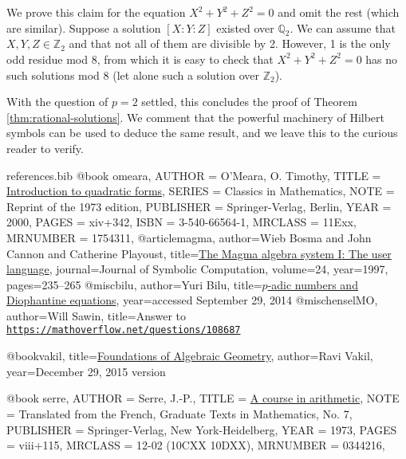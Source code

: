 \documentclass[10pt,a4paper]{amsart}
\numberwithin{equation}{section}
\numberwithin{figure}{section}
\numberwithin{table}{section}
\theoremstyle{definition}
\theoremstyle{plain}
\theoremstyle{remark}
\theoremstyle{plain}
\theoremstyle{definition}
\theoremstyle{plain}
\theoremstyle{plain}
\newcommand{\Z}{\mathbb{Z}}
\newcommand{\Q}{\mathbb{Q}}
\begin{document}
	We prove this claim for the equation $X^2 + Y^2 + Z^2 = 0$ and omit the rest (which are similar). Suppose a solution $[X:Y:Z]$ existed over $\Q_2$. We can assume that $X,Y,Z\in \Z_2$ and that not all of them are divisible by 2. However, 1 is the only odd residue mod 8, from which it is easy to check that $X^2 + Y^2 + Z^2 = 0$ has no such solutions mod 8 (let alone such a solution over $\Z_2$).
	
	With the question of $p=2$ settled, this concludes the proof of Theorem \ref{thm:rational-solutions}. We comment that the powerful machinery of Hilbert symbols can be used to deduce the same result, and we leave this to the curious reader to verify.
	\begin{filecontents}{references.bib}
		@book {omeara,
			AUTHOR = {O'Meara, O. Timothy},
			TITLE = {\href{https://link.springer.com/book/10.1007\%2F978-3-642-62031-7}{Introduction to quadratic forms}},
			SERIES = {Classics in Mathematics},
			NOTE = {Reprint of the 1973 edition},
			PUBLISHER = {Springer-Verlag, Berlin},
			YEAR = {2000},
			PAGES = {xiv+342},
			ISBN = {3-540-66564-1},
			MRCLASS = {11Exx},
			MRNUMBER = {1754311},
		}
		@article{magma,
			author={Wieb Bosma and John Cannon and Catherine Playoust},
			title={\href{http://www.sciencedirect.com/science/article/pii/S074771719690125X}{The Magma algebra system {I}: The user language}},
			journal={Journal of Symbolic Computation},
			volume={24},
			year={1997},
			pages={235--265}
		}
		@misc{bilu,
			author={Yuri Bilu},
			title={\href{https://www.math.u-bordeaux.fr/~abesheno/bilu.pdf}{$p$-adic numbers and Diophantine equations}},
			year={accessed September 29, 2014}
		}
		@misc{henselMO,
			author={Will Sawin},
			title={Answer to \href{https://mathoverflow.net/questions/108687}{\texttt{https://mathoverflow.net/questions/108687}}}
		}
		
		@book{vakil,
			title={\href{http://math.stanford.edu/~vakil/216blog/index.html}{Foundations of Algebraic Geometry}},
			author={Ravi Vakil},
			year={December 29, 2015 version}
		}

@book {serre,
    AUTHOR = {Serre, J.-P.},
     TITLE = {\href{https://link.springer.com/book/10.1007\%2F978-1-4684-9884-4}{A course in arithmetic}},
      NOTE = {Translated from the French,
              Graduate Texts in Mathematics, No. 7},
 PUBLISHER = {Springer-Verlag, New York-Heidelberg},
      YEAR = {1973},
     PAGES = {viii+115},
   MRCLASS = {12-02 (10CXX 10DXX)},
  MRNUMBER = {0344216},
}
	\end{filecontents}
	
	
	
	
\end{document}
